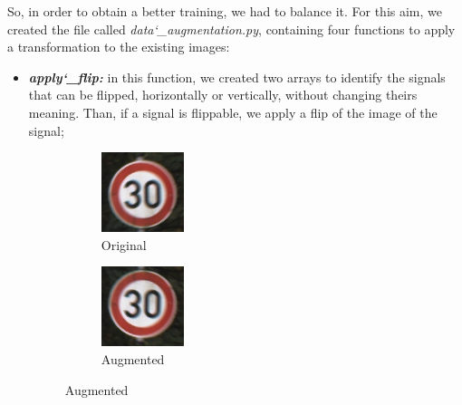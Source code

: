 So, in order to obtain a better training, we had to balance it.
For this aim, we created the file called \textit{data\char`_augmentation.py}, containing four functions to apply a transformation to the existing images:
\begin{itemize}
\item \textbf{\textit{apply\char`_flip:}} in this function, we created two arrays to identify the signals that can be flipped, horizontally or vertically, without changing theirs meaning. Than, if a signal is flippable, we apply a flip of the image of the signal;
\begin{figure}[!ht]
\centering
\begin{subfigure}{.2\textwidth}
  \centering
  \includegraphics[width=.8\linewidth]{img/00001_00011_00027.png}
  \caption{Original}
  \label{fig:sub1}
\end{subfigure}%
\begin{subfigure}{.2\textwidth}
  \centering
  \includegraphics[width=.8\linewidth]{img/1.png}
  \caption{Augmented}
  \label{fig:sub2}
\end{subfigure}
\end{figure}


\end{itemize}
